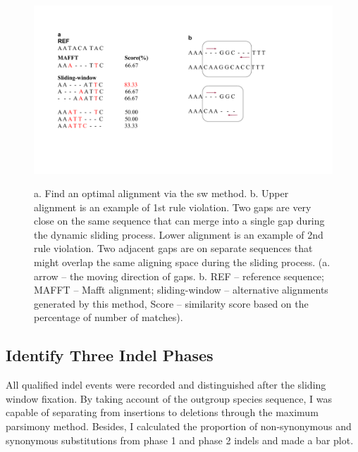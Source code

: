 \begin{figure}[H]
     \centering
     \begin{minipage}[t]{1\textwidth }
     \includegraphics[width=1.2\linewidth]{Fig3.pdf}
     {{a. Find an optimal alignment via the sw method. b. Upper alignment is an example of 1st rule violation. Two gaps are very close on the same sequence that can merge into a single gap during the dynamic sliding process. Lower alignment is an example of 2nd rule violation. Two adjacent gaps are on separate sequences that might overlap the same aligning space during the sliding process. (a. arrow -- the moving direction of gaps. b. REF -- reference sequence; MAFFT -- Mafft alignment; sliding-window -- alternative alignments generated by this method, Score -- similarity score based on the percentage of number of matches).} 
 \par}
     \end{minipage}
\end{figure}

\subsection{Identify Three Indel Phases}
All qualified indel events were recorded and distinguished after the sliding window fixation. By taking account of the outgroup species sequence, I was capable of separating from insertions to deletions through the maximum parsimony method. Besides, I calculated the proportion of non-synonymous and synonymous substitutions from phase 1 and phase 2 indels and made a bar plot.  

